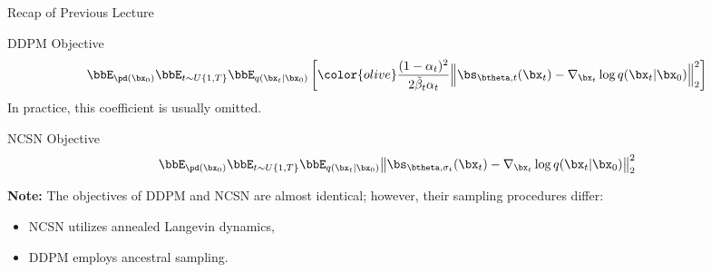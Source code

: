 \documentclass{beamer}
\begin{document}
\begin{frame}
\titlepage
	\resetonslide
\end{frame}
\begin{frame}{Recap of Previous Lecture}
	\begin{block}{DDPM Objective}
		\vspace{-0.5cm}
		\[
			\bbE_{\pd(\bx_0)} \bbE_{t \sim U\{1, T\}}\bbE_{q(\bx_t | \bx_0)} \left[ {\color{olive}\frac{(1 - \alpha_t)^2}{2\tilde{\beta}_t \alpha_t}} \Bigl\|  \bs_{\btheta, t} (\bx_t) - \nabla_{\bx_t} \log q(\bx_t | \bx_0) \Bigr\|_2^2  \right]
		\]
		In practice, {\color{olive}this coefficient} is usually omitted.
	\end{block}
	\begin{block}{NCSN Objective}
		\vspace{-0.3cm}
		\[
			\bbE_{\pd(\bx_0)} \bbE_{t \sim U\{1, T\}} \bbE_{q(\bx_t | \bx_0)}\bigl\| \bs_{\btheta, \sigma_t}(\bx_t) - \nabla_{\bx_t} \log q(\bx_t | \bx_0) \bigr\|^2_2 
		\]
		\vspace{-0.3cm}
	\end{block}
	\textbf{Note:} The objectives of DDPM and NCSN are almost identical; however, their sampling procedures differ:
	\begin{itemize}
		\item NCSN utilizes annealed Langevin dynamics,
		\item DDPM employs ancestral sampling.
	\end{itemize}
\end{frame}
\end{document}

